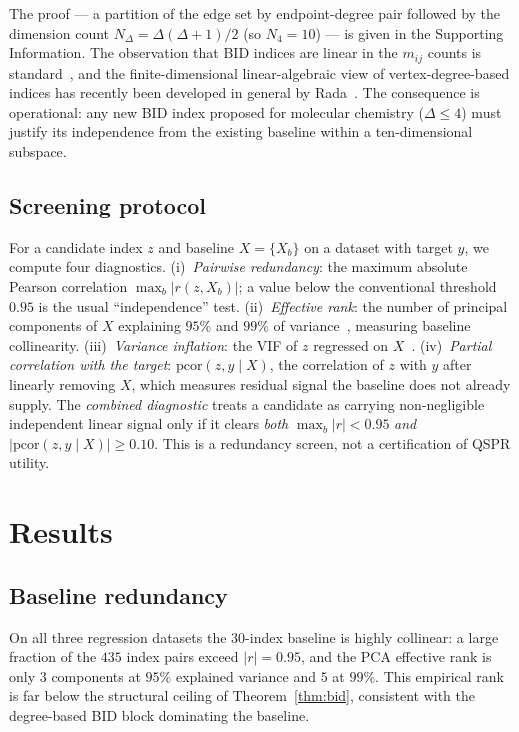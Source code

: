 \documentclass[11pt,a4paper]{article}
\theoremstyle{definition}
\begin{document}
The proof --- a partition of the edge set by endpoint-degree pair
followed by the dimension count $N_\Delta = \Delta(\Delta+1)/2$
(so $N_4 = 10$) --- is given in the Supporting Information. The
observation that BID indices are linear in the $m_{ij}$ counts is
standard~\cite{BorovicaninDasFurtulaGutman2017Zagreb}, and the
finite-dimensional linear-algebraic view of vertex-degree-based
indices has recently been developed in general by
Rada~\cite{Rada2026LinearVDB}. The consequence is operational: any
new BID index proposed for molecular chemistry ($\Delta\le 4$) must
justify its independence from the existing baseline within a
ten-dimensional subspace.

\subsection{Screening protocol}

For a candidate index $z$ and baseline $X=\{X_b\}$ on a dataset with
target $y$, we compute four diagnostics. (i)~\emph{Pairwise
redundancy}: the maximum absolute Pearson correlation
$\max_b |r(z, X_b)|$; a value below the conventional threshold
$0.95$ is the usual ``independence'' test. (ii)~\emph{Effective
rank}: the number of principal components of $X$ explaining $95\%$
and $99\%$ of variance~\cite{WoldEsbensenGeladi1987PCA}, measuring
baseline collinearity. (iii)~\emph{Variance inflation}: the VIF of
$z$ regressed on $X$~\cite{OBrien2007VIF}. (iv)~\emph{Partial
correlation with the target}: $\mathrm{pcor}(z, y \mid X)$, the
correlation of $z$ with $y$ after linearly removing $X$, which
measures residual signal the baseline does not already supply. The
\emph{combined diagnostic} treats a candidate as carrying
non-negligible independent linear signal only if it clears
\emph{both} $\max_b|r| < 0.95$ \emph{and}
$|\mathrm{pcor}(z, y\mid X)| \ge 0.10$. This is a redundancy screen,
not a certification of QSPR utility.

\section{Results}

\subsection{Baseline redundancy}

On all three regression datasets the $30$-index baseline is highly
collinear: a large fraction of the $435$ index pairs exceed
$|r| = 0.95$, and the PCA effective rank is only $3$ components at
$95\%$ explained variance and $5$ at $99\%$. This empirical rank is
far below the structural ceiling of Theorem~\ref{thm:bid},
consistent with the degree-based BID block dominating the baseline.
\end{document}

